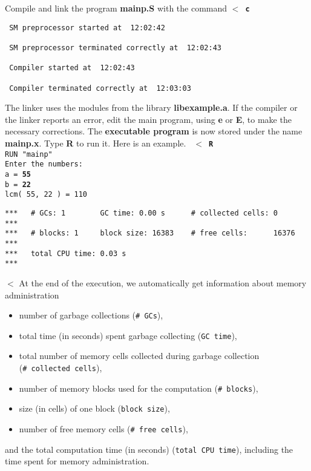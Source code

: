 Compile and link the program {\bf mainp.S} with the command
\leer
{\tt $<$ {\bf c} \care }
\begin{verbatim}
 SM preprocessor started at  12:02:42

 SM preprocessor terminated correctly at  12:02:43

 Compiler started at  12:02:43

 Compiler terminated correctly at  12:03:03
\end{verbatim}
The linker uses the modules from the library {\bf libexample.a}. If the compiler
or the linker reports an error, edit the main program, using {\bf e} or {\bf E}, to
make the necessary corrections.
The {\bf executable program} is now stored under the name 
{\bf mainp.x}.  Type {\bf R} to run it. Here is an example.
\leer
{\tt
$<$ {\bf R} \care \\
RUN "mainp" \\[1.0eM]
Enter the numbers:\\
a = {\bf 55 \care}\\
b = {\bf 22 \care}\\
lcm( 55, 22 ) = 110
}
\begin{verbatim} 
***   # GCs: 1        GC time: 0.00 s      # collected cells: 0        *** 
***   # blocks: 1     block size: 16383    # free cells:      16376    ***  
***   total CPU time: 0.03 s                                           ***   
\end{verbatim}
$<$
\leer
At the end of the execution, we automatically get information about memory
administration
\begin{itemize}
\item number of garbage collections ({\tt \# GCs}),
\item total time (in seconds) spent garbage collecting ({\tt GC time}),
\item total number of memory cells collected during garbage collection \\
      ({\tt \# collected cells}),
\item number of memory blocks used for the computation ({\tt \# blocks}),
\item size (in cells) of one block ({\tt block size}),
\item number of free memory cells ({\tt \# free cells}),
\end{itemize}
and the total computation time (in seconds) ({\tt total CPU time}), including
the time spent for memory administration.

